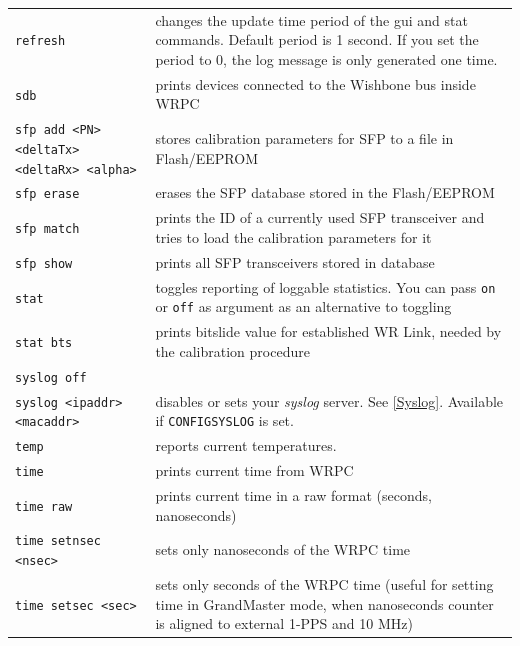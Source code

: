 \documentclass[a4paper, 12pt]{article}
\renewcommand{\_}{\underscore\allowbreak}
\newcommand{\code}[1]{\texttt{#1}}
\begin{document}
\begin{longtable}{  p{7.5cm}  p{7cm} }
  \code{refresh} & changes the update time period of the gui and stat commands.
    Default period is 1 second. If you set the period to 0, the log message is
    only generated one time. \\

  \code{sdb} & prints devices connected to the Wishbone bus inside WRPC \\

  \code{sfp add <PN> <deltaTx> <deltaRx> <alpha>} & stores calibration
    parameters for SFP to a file in Flash/EEPROM \\

  \code{sfp erase} & erases the SFP database stored in the Flash/EEPROM \\

  \code{sfp match} & prints the ID of a currently used SFP transceiver and
    tries to load the calibration parameters for it \\

  \code{sfp show} & prints all SFP transceivers stored in database \\

  \code{stat} & toggles reporting of loggable statistics. You can pass
    \texttt{on} or \texttt{off} as argument as an alternative to toggling \\

  \code{stat bts} & prints bitslide value for established WR Link, needed by
    the calibration procedure \\

  \code{syslog off} &  \\
  \code{syslog <ipaddr> <macaddr>} & disables or sets your \textit{syslog}
    server. See \ref{Syslog}. Available if \texttt{CONFIG\_SYSLOG} is set. \\

  \code{temp} & reports current temperatures. \\

  \code{time} & prints current time from WRPC \\

  \code{time raw} &  prints current time in a raw format (seconds, nanoseconds) \\

  \code{time setnsec <nsec>} & sets only nanoseconds of the WRPC time \\

  \code{time setsec <sec>} & sets only seconds of the WRPC time (useful for
    setting time in GrandMaster mode, when nanoseconds counter is aligned to
    external 1-PPS and 10 MHz) \\


\end{longtable}
\end{document}
